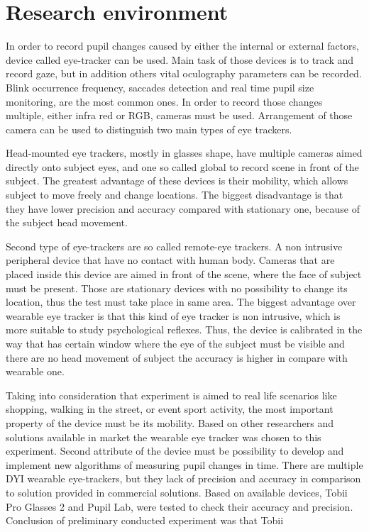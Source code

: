 \documentclass[USenglish,twocolumn]{article}
\begin{document}
\section{Research environment}
In order to record pupil changes caused by either the internal or external factors, device called eye-tracker can be used. Main task of those devices is to track and record gaze, but in addition others vital oculography parameters can be recorded. Blink occurrence frequency, saccades detection and real time pupil size monitoring, are the most common ones. In order to record those changes multiple, either infra red or RGB, cameras must be used. Arrangement of those camera can be used to distinguish two main types of eye trackers. 

Head-mounted eye trackers, mostly in glasses shape, have multiple cameras aimed directly onto subject eyes, and one so called global to record scene in front of the subject.  The greatest advantage of these devices is their mobility, which allows subject to move freely and change locations. The biggest disadvantage is that they have lower precision and accuracy compared with stationary one, because of the subject head movement.

Second type of eye-trackers are so called remote-eye trackers. A non intrusive peripheral device that have no contact with human body. Cameras that are placed inside this device are aimed in front of the scene, where the face of subject must be present. Those are stationary devices with no possibility to change its location, thus the test must take place in same area. The biggest advantage over wearable eye tracker is that this kind of eye tracker is non intrusive, which is more suitable to study psychological reflexes. Thus, the device is calibrated in the way that has certain window where the eye of the subject must be visible and there are no head movement of subject the accuracy is higher in compare with wearable one.

Taking into consideration that experiment is aimed to real life scenarios like shopping, walking in the street, or event sport activity, the most important property of the device must be its mobility. Based on other researchers and solutions available in market the wearable eye tracker was chosen to this experiment. Second attribute of the device must be possibility to develop and implement new algorithms of measuring pupil changes in time. There are multiple DYI wearable eye-trackers, but they lack of precision and accuracy in comparison to solution provided in commercial solutions. Based on available devices, Tobii Pro Glasses 2 and Pupil Lab, were tested to check their accuracy and precision. Conclusion of preliminary conducted experiment was that Tobii
\end{document}
